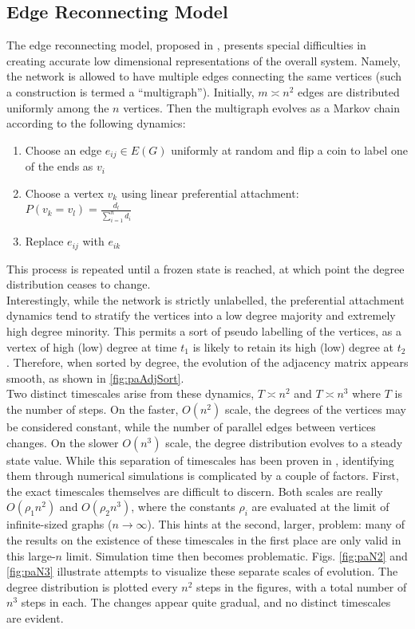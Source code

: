 \documentclass[11pt]{article}
\begin{document}
\subsection{Edge Reconnecting Model}
The edge reconnecting model, proposed in \cite{balazs'paper}, presents special difficulties in creating accurate low dimensional representations of the overall system. Namely, the network is allowed to have multiple edges connecting the same vertices (such a construction is termed a ``multigraph''). Initially, $m\asymp n^{2}$ edges are distributed uniformly among the $n$ vertices. Then the multigraph evolves as a Markov chain according to the following dynamics:
\begin{enumerate}
\item Choose an edge $e_{ij} \in E(G)$ uniformly at random and flip a coin to label one of the ends as $v_{i}$
\item Choose a vertex $v_{k}$ using linear preferential attachment: $P(v_{k} = v_{l}) = \frac{d_{l}}{\sum\limits_{i=1}^{n} d_{i}}$
\item Replace $e_{ij}$ with $e_{ik}$
\end{enumerate}
This process is repeated until a frozen state is reached, at which point the degree distribution ceases to change.\vspace{1mm}\\
Interestingly, while the network is strictly unlabelled, the preferential attachment dynamics tend to stratify the vertices into a low degree majority and extremely high degree minority. This permits a sort of pseudo labelling of the vertices, as a vertex of high (low) degree at time $t_{1}$ is likely to retain its high (low) degree at $t_{2}$. Therefore, when sorted by degree, the evolution of the adjacency matrix appears smooth, as shown in \ref{fig:paAdjSort}. \vspace{1mm}\\
Two distinct timescales arise from these dynamics, $T\asymp n^{2}$ and $T\asymp n^{3}$ where $T$ is the number of steps. On the faster, $O(n^{2})$ scale, the degrees of the vertices may be considered constant, while the number of parallel edges between vertices changes. On the slower $O(n^{3})$ scale, the degree distribution evolves to a steady state value. While this separation of timescales has been proven in \cite{balazs:rsa12}, identifying them through numerical simulations is complicated by a couple of factors. First, the exact timescales themselves are difficult to discern. Both scales are really $O(\rho_{1} n^{2})$ and $O(\rho_{2} n^{3})$, where the constants $\rho_{i}$ are evaluated at the limit of infinite-sized graphs ($n\rightarrow \infty$). This hints at the second, larger, problem: many of the results on the existence of these timescales in the first place are only valid in this large-$n$ limit. Simulation time then becomes problematic. Figs. \ref{fig:paN2} and \ref{fig:paN3} illustrate attempts to visualize these separate scales of evolution. The degree distribution is plotted every $n^{2}$ steps in the figures, with a total number of $n^{3}$ steps in each. The changes appear quite gradual, and no distinct timescales are evident.\\
\end{document}
